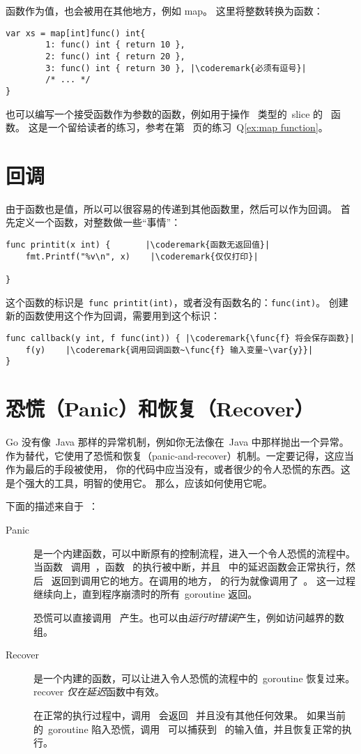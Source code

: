 函数作为值，也会被用在其他地方，例如 map。
这里将整数转换为函数：
\begin{lstlisting}[caption=使用 map 的函数作为值]
var xs = map[int]func() int{
        1: func() int { return 10 },
        2: func() int { return 20 },
        3: func() int { return 30 }, |\coderemark{必须有逗号}|
        /* ... */
}
\end{lstlisting}
也可以编写一个接受函数作为参数的函数，例如用于操作~ 类型的~slice 的~ 函数。
这是一个留给读者的练习，参考在第~\pageref{ex:map function} 页的练习~Q\ref{ex:map function}。

\section{回调}
\label{sec:callbacks}
由于函数也是值，所以可以很容易的传递到其他函数里，然后可以作为回调。
首先定义一个函数，对整数做一些``事情''：
\begin{lstlisting}
func printit(x int) {       |\coderemark{函数无返回值}|
    fmt.Printf("%v\n", x)    |\coderemark{仅仅打印}|

}
\end{lstlisting}
这个函数的标识是~\lstinline{func printit(int)}，或者没有函数名的：\mbox{\lstinline{func(int)}}。
创建新的函数使用这个作为回调，需要用到这个标识：
\begin{lstlisting}
func callback(y int, f func(int)) { |\coderemark{\func{f} 将会保存函数}|
    f(y)    |\coderemark{调用回调函数~\func{f} 输入变量~\var{y}}|
}
\end{lstlisting}

\section{恐慌（Panic）和恢复（Recover）}
\label{sec:panic}
Go 没有像~Java 那样的异常机制，例如你无法像在~Java 中那样抛出一个异常。
作为替代，它使用了恐慌和恢复（panic-and-recover）机制。一定要记得，这应当作为最后的手段被使用，
你的代码中应当没有，或者很少的令人恐慌的东西。这是个强大的工具，明智的使用它。
那么，应该如何使用它呢。

下面的描述来自于~\cite{go_blog_panic}：
\begin{description}
\item[Panic]{是一个内建函数，可以中断原有的控制流程，进入一个令人恐慌的流程中。
当函数~ 调用~，函数~ 的执行被中断，并且~ 
中的延迟函数会正常执行，然后~ 返回到调用它的地方。在调用的地方，
 的行为就像调用了~。
这一过程继续向上，直到程序崩溃时的所有~goroutine 返回。

恐慌可以直接调用~ 产生。也可以由\emph{运行时错误}产生，例如访问越界的数组。}

\item[Recover]{是一个内建的函数，可以让进入令人恐慌的流程中的~goroutine 恢复过来。
recover \emph{仅在}\emph{延迟}函数中有效。

在正常的执行过程中，调用~ 会返回~ 并且没有其他任何效果。
如果当前的~goroutine 陷入恐慌，调用~ 可以捕获到~ 的输入值，并且恢复正常的执行。}
\end{description}

